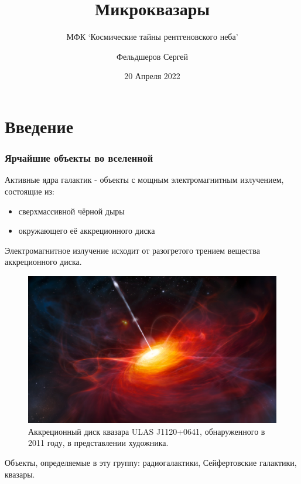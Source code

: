 \documentclass[8pt]{beamer}
\title{Микроквазары}
\subtitle{МФК `Космические тайны рентгеновского неба'}
\author{Фельдшеров Сергей}
\date{20 Апреля 2022}
\begin{document}

\begin{frame}
	\titlepage
\end{frame}

\section{Введение}

\begin{frame}
	\frametitle{Ярчайшие объекты во вселенной}
	Активные ядра галактик - объекты с мощным электромагнитным излучением, состоящие из:
	\begin{itemize}
		\item сверхмассивной чёрной дыры
		\item окружающего её аккреционного диска
	\end{itemize}\pause
	Электромагнитное излучение исходит от разогретого трением вещества аккреционного диска.
	\begin{figure}[h]
	    \centering
		\includegraphics[width=.5\textwidth]{resources/quasar-rendering.jpg}
		\caption{Аккреционный диск квазара ULAS J1120+0641, обнаруженного в 2011 году, в представлении художника.}
	\end{figure}
	Объекты, определяемые в эту группу: радиогалактики, Сейфертовские галактики, квазары.

\end{frame}
\end{document}
